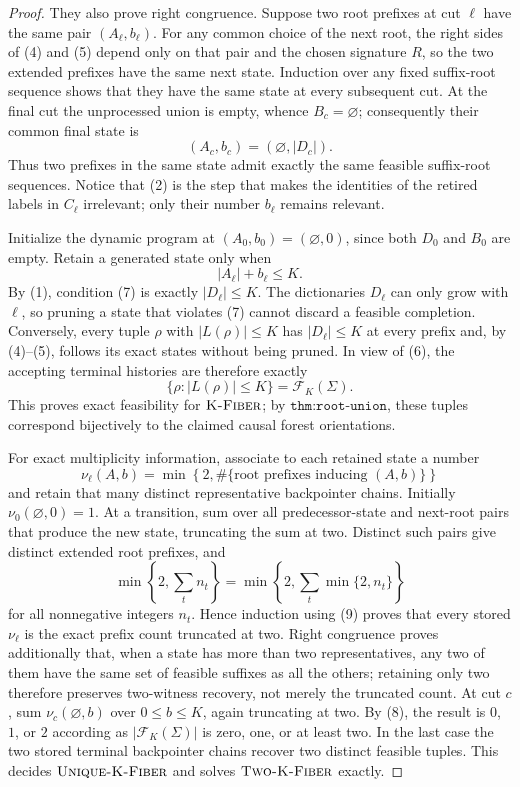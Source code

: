 \documentclass{article}
\begin{document}
\begin{proof}
They also prove right congruence.  Suppose two root prefixes at cut \(\ell\) have the same pair \((A_\ell,b_\ell)\).  For any common choice of the next root, the right sides of (4) and (5) depend only on that pair and the chosen signature \(R\), so the two extended prefixes have the same next state.  Induction over any fixed suffix-root sequence shows that they have the same state at every subsequent cut.  At the final cut the unprocessed union is empty, whence \(B_c=\varnothing\); consequently their common final state is
\[
(A_c,b_c)=(\varnothing,|D_c|). \tag{6}
\]
Thus two prefixes in the same state admit exactly the same feasible suffix-root sequences.  Notice that (2) is the step that makes the identities of the retired labels in \(C_\ell\) irrelevant; only their number \(b_\ell\) remains relevant.

Initialize the dynamic program at \((A_0,b_0)=(\varnothing,0)\), since both \(D_0\) and \(B_0\) are empty.  Retain a generated state only when
\[
|A_\ell|+b_\ell\leq K. \tag{7}
\]
By (1), condition (7) is exactly \(|D_\ell|\leq K\).  The dictionaries \(D_\ell\) can only grow with \(\ell\), so pruning a state that violates (7) cannot discard a feasible completion.  Conversely, every tuple \(\rho\) with \(|L(\rho)|\leq K\) has \(|D_\ell|\leq K\) at every prefix and, by (4)--(5), follows its exact states without being pruned.  In view of (6), the accepting terminal histories are therefore exactly
\[
\{\rho:|L(\rho)|\leq K\}=\mathcal F_K(\Sigma). \tag{8}
\]
This proves exact feasibility for \(\textsc{K-Fiber}\); by \(\texttt{thm:root-union}\), these tuples correspond bijectively to the claimed causal forest orientations.

For exact multiplicity information, associate to each retained state a number
\[
\nu_\ell(A,b)=
\min\!\left\{2,\#\{\text{root prefixes inducing }(A,b)\}\right\}
\]
and retain that many distinct representative backpointer chains.  Initially \(\nu_0(\varnothing,0)=1\).  At a transition, sum over all predecessor-state and next-root pairs that produce the new state, truncating the sum at two.  Distinct such pairs give distinct extended root prefixes, and
\[
\min\!\left\{2,\sum_t n_t\right\}
=
\min\!\left\{2,\sum_t\min\{2,n_t\}\right\} \tag{9}
\]
for all nonnegative integers \(n_t\).  Hence induction using (9) proves that every stored \(\nu_\ell\) is the exact prefix count truncated at two.  Right congruence proves additionally that, when a state has more than two representatives, any two of them have the same set of feasible suffixes as all the others; retaining only two therefore preserves two-witness recovery, not merely the truncated count.  At cut \(c\), sum \(\nu_c(\varnothing,b)\) over \(0\leq b\leq K\), again truncating at two.  By (8), the result is \(0\), \(1\), or \(2\) according as \(|\mathcal F_K(\Sigma)|\) is zero, one, or at least two.  In the last case the two stored terminal backpointer chains recover two distinct feasible tuples.  This decides \(\textsc{Unique-K-Fiber}\) and solves \(\textsc{Two-K-Fiber}\) exactly.


\end{proof}
\end{document}

